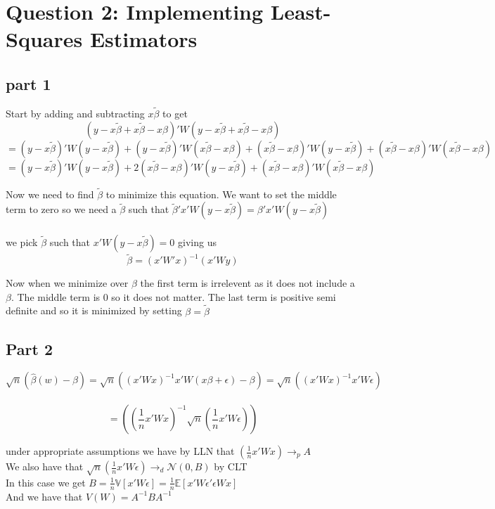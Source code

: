 \documentclass[11pt]{article}
\newcommand{\plim}{\rightarrow_{p}}
\begin{document}
\section{Question 2: Implementing Least-Squares Estimators}

\subsection{part 1}

Start by adding and subtracting $x \tilde{\beta}$ to get 
$$ (y-x\tilde{\beta} + x\tilde{\beta} - x\beta)'W(y-x\tilde{\beta} + x\tilde{\beta} - x\beta) $$
$$ = (y-x\tilde{\beta})'W(y-x\tilde{\beta}) + (y-x\tilde{\beta})'W(x\tilde{\beta} - x\beta) + (x\tilde{\beta} - x\beta)'W(y-x\tilde{\beta}) + (x\tilde{\beta} - x\beta)'W(x\tilde{\beta} - x\beta)$$
$$ = (y-x\tilde{\beta})'W(y-x\tilde{\beta}) + 2(x\tilde{\beta} - x\beta)'W(y-x\tilde{\beta}) + (x\tilde{\beta} - x\beta)'W(x\tilde{\beta} - x\beta)$$

Now we need to find $\tilde{\beta}$ to minimize this equation. We want to set the middle term to zero so we need a $\tilde{\beta}$ such that $\tilde{\beta}'x'W(y-x\tilde{\beta}) = \beta'x'W(y-x\tilde{\beta})$
\\ \\ 
we pick $\tilde{\beta}$ such that $x'W(y-x\tilde{\beta}) = 0$ giving us $$\tilde{\beta}=(x'W'x)^{-1}(x'Wy)$$

Now when we minimize over $\beta$ the first term is irrelevent as it does not include a $\beta$. The middle term is 0 so it does not matter. The last term is positive semi definite and so it is minimized by setting $\beta = \tilde{\beta}$

\subsection{Part 2}

$$ \sqrt{n} (\hat{\beta}(w)- \beta) = \sqrt{n}((x'Wx)^{-1}x'W(x\beta+\epsilon)-\beta)  
= \sqrt{n}((x'Wx)^{-1}x'W \epsilon)$$ \\
$$ = ((\frac{1}{n}x'Wx)^{-1} \sqrt{n} (\frac{1}{n} x'W\epsilon))$$

under appropriate assumptions we have by LLN that $ (\frac{1}{n}x'Wx) \plim A $ \\
We also have that $  \sqrt{n} (\frac{1}{n} x'W\epsilon) \rightarrow_{d} \mathcal{N}(0,B)$ by CLT  \\
In this case we get $ B = \frac{1}{n}  \mathbb{V}[x'W\epsilon] = \frac{1}{n} \mathbb{E}[x'W\epsilon'\epsilon Wx] $\\
And we have that $ V(W) = A^{-1}BA^{-1} $
 
\end{document}
